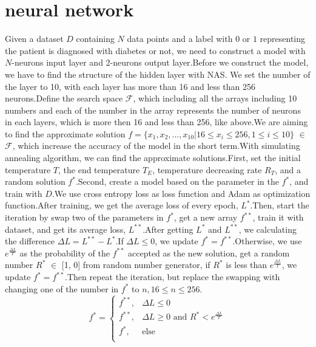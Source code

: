 \documentclass[twocolumn,10pt]{article}
\begin{document}
\section{neural network}
  Given a dataset $D$ containing $N$ data points and a label with $0$ or $1$ representing the patient is diagnosed with diabetes or 
  not, we need to construct a model with $N$-neurons input layer and 2-neurons output layer.Before we construct the model, we have 
  to find the structure of the hidden layer with NAS.
  We set the number of the layer to 10, with each layer has more than 16 and less than 256 neurons.Define the search space $\mathcal{F}$, 
  which including all the arrays including 10 numbers and each of the number in the array represents the number of neurons in each layers, 
  which is more then 16 and less than 256, like above.We are aiming to find the approximate solution 
  $f= \{x_1, x_2, ..., x_{10}|16\leq x_i \leq 256, 1\leq i \leq 10\}$ $\in$ $\mathcal{F}$, which increase the accuracy of the model in 
  the short term.With simulating annealing algorithm\cite{17235}, we can find the approximate solutions.First, set the initial temperature 
  $T$, the end temperature $T_E$, temperature decreasing rate $R_T$, and a random solution $f^*$.Second, create a model based on the 
  parameter in the $f^*$, and train with $D$.We use cross entropy loss as loss function and Adam as optimization function.After training, 
  we get the average loss of every epoch, $L^*$.Then, start the iteration by swap two of the parameters in $f^*$, get a new array $f^{**}$, 
  train it with dataset, and get its average loss, $L^{**}$.After getting $L^*$ and $L^{**}$, we calculating the difference 
  $\Delta L = L^{**} - L^*$.If $\Delta L \leq 0$, we update $f^* = f^{**}$.Otherwise, we use $e^{\frac{\Delta L}{T}}$ as the probability 
  of the $f^{**}$ accepted as the new solution, get a random number $R^*$ $\in$ [1, 0] from random number generator, if $R^*$ is less than 
  $e^{\frac{\Delta L}{T}}$, we update $f^* = f^{**}$.Then repeat the iteration, but replace the swapping with changing one of the number 
  in $f^*$ to $n, 16 \leq n \leq 256$.
  \begin{equation}
	  f^* = 
	  \begin{cases}
	  f^{**},  &\Delta L\le 0 \\
	  f^{**},  &\Delta L \ge 0 \text{ and } R^*<e^{\frac{\Delta L}{T}} \\ 
	  f^{*},   &\text{else}\\
	  \end{cases}
  \end{equation} 
\end{document}

